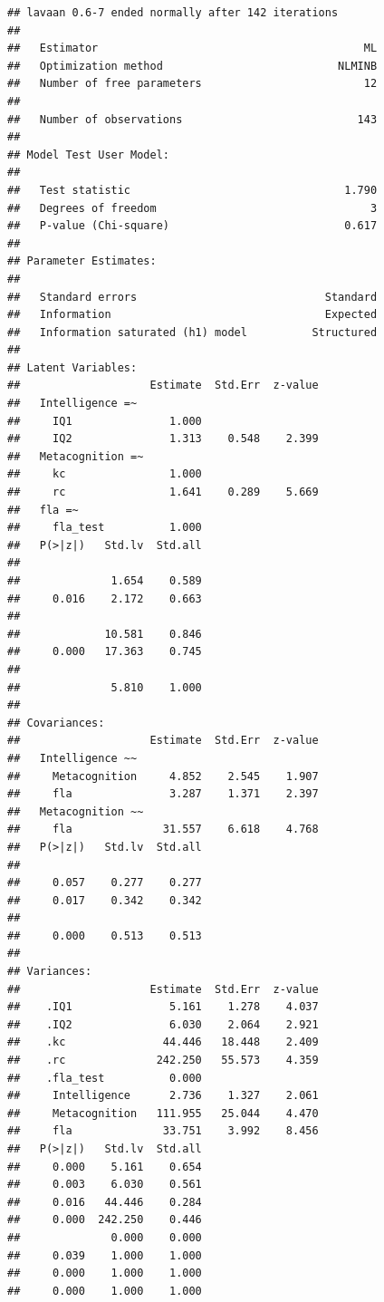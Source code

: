 \documentclass[
]{book}
\begin{document}
\begin{verbatim}
## lavaan 0.6-7 ended normally after 142 iterations
## 
##   Estimator                                         ML
##   Optimization method                           NLMINB
##   Number of free parameters                         12
##                                                       
##   Number of observations                           143
##                                                       
## Model Test User Model:
##                                                       
##   Test statistic                                 1.790
##   Degrees of freedom                                 3
##   P-value (Chi-square)                           0.617
## 
## Parameter Estimates:
## 
##   Standard errors                             Standard
##   Information                                 Expected
##   Information saturated (h1) model          Structured
## 
## Latent Variables:
##                    Estimate  Std.Err  z-value
##   Intelligence =~                            
##     IQ1               1.000                  
##     IQ2               1.313    0.548    2.399
##   Metacognition =~                           
##     kc                1.000                  
##     rc                1.641    0.289    5.669
##   fla =~                                     
##     fla_test          1.000                  
##   P(>|z|)   Std.lv  Std.all
##                            
##              1.654    0.589
##     0.016    2.172    0.663
##                            
##             10.581    0.846
##     0.000   17.363    0.745
##                            
##              5.810    1.000
## 
## Covariances:
##                    Estimate  Std.Err  z-value
##   Intelligence ~~                            
##     Metacognition     4.852    2.545    1.907
##     fla               3.287    1.371    2.397
##   Metacognition ~~                           
##     fla              31.557    6.618    4.768
##   P(>|z|)   Std.lv  Std.all
##                            
##     0.057    0.277    0.277
##     0.017    0.342    0.342
##                            
##     0.000    0.513    0.513
## 
## Variances:
##                    Estimate  Std.Err  z-value
##    .IQ1               5.161    1.278    4.037
##    .IQ2               6.030    2.064    2.921
##    .kc               44.446   18.448    2.409
##    .rc              242.250   55.573    4.359
##    .fla_test          0.000                  
##     Intelligence      2.736    1.327    2.061
##     Metacognition   111.955   25.044    4.470
##     fla              33.751    3.992    8.456
##   P(>|z|)   Std.lv  Std.all
##     0.000    5.161    0.654
##     0.003    6.030    0.561
##     0.016   44.446    0.284
##     0.000  242.250    0.446
##              0.000    0.000
##     0.039    1.000    1.000
##     0.000    1.000    1.000
##     0.000    1.000    1.000
\end{verbatim}
\end{document}
